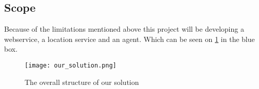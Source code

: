 \subsection{Scope}
Because of the limitations mentioned above this project will be developing a webservice, a location service and an agent.
Which can be seen on \cref{fig:solution_structure} in the blue box.
 
 \begin{figure}[H]
\texttt{[image: our\_solution.png]}
\caption{The overall structure of our solution}
\label{fig:solution_structure}
\end{figure}